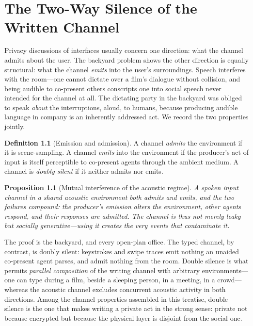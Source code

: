 \documentclass[11pt,oneside]{book}
\theoremstyle{plain}
\newtheorem{proposition}[theorem]{Proposition}
\theoremstyle{definition}
\newtheorem{definition}[theorem]{Definition}
\theoremstyle{remark}
\begin{document}
\chapter{The Two-Way Silence of the Written Channel}

Privacy discussions of interfaces usually concern one direction: what the channel admits about the user. The backyard problem shows the other direction is equally structural: what the channel \emph{emits} into the user's surroundings. Speech interferes with the room---one cannot dictate over a film's dialogue without collision, and being audible to co-present others conscripts one into social speech never intended for the channel at all. The dictating party in the backyard was obliged to speak \emph{about} the interruptions, aloud, to humans, because producing audible language in company is an inherently addressed act. We record the two properties jointly.

\begin{definition}[Emission and admission]
A channel \emph{admits} the environment if it is scene-sampling. A channel \emph{emits} into the environment if the producer's act of input is itself perceptible to co-present agents through the ambient medium. A channel is \emph{doubly silent} if it neither admits nor emits.
\end{definition}

\begin{proposition}[Mutual interference of the acoustic regime]
A spoken input channel in a shared acoustic environment both admits and emits, and the two failures compound: the producer's emission alters the environment, other agents respond, and their responses are admitted. The channel is thus not merely leaky but \emph{socially generative}---using it creates the very events that contaminate it.
\end{proposition}

The proof is the backyard, and every open-plan office. The typed channel, by contrast, is doubly silent: keystrokes and swipe traces emit nothing an unaided co-present agent parses, and admit nothing from the room. Double silence is what permits \emph{parallel composition} of the writing channel with arbitrary environments---one can type during a film, beside a sleeping person, in a meeting, in a crowd---whereas the acoustic channel excludes concurrent acoustic activity in both directions. Among the channel properties assembled in this treatise, double silence is the one that makes writing a private act in the strong sense: private not because encrypted but because the physical layer is disjoint from the social one.
\end{document}
